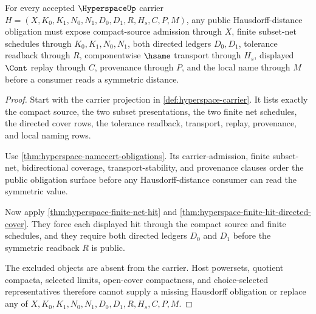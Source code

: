 \begin{theorem}
\label{thm:hyperspace-hausdorff-obligation-surface}
For every accepted $\HyperspaceUp$ carrier $H=(X,K_0,K_1,N_0,N_1,D_0,D_1,R,H_s,C,P,M)$, any public Hausdorff-distance obligation must expose compact-source admission through $X$, finite subset-net schedules through $K_0,K_1,N_0,N_1$, both directed ledgers $D_0,D_1$, tolerance readback through $R$, componentwise $\hsame$ transport through $H_s$, displayed $\Cont$ replay through $C$, provenance through $P$, and the local name through $M$ before a consumer reads a symmetric distance.
\end{theorem}
\begin{proof}
Start with the carrier projection in \autoref{def:hyperspace-carrier}. It lists exactly the compact source, the two subset presentations, the two finite net schedules, the directed cover rows, the tolerance readback, transport, replay, provenance, and local naming rows.

Use \autoref{thm:hyperspace-namecert-obligations}. Its carrier-admission, finite subset-net, bidirectional coverage, transport-stability, and provenance clauses order the public obligation surface before any Hausdorff-distance consumer can read the symmetric value.

Now apply \autoref{thm:hyperspace-finite-net-hit} and \autoref{thm:hyperspace-finite-hit-directed-cover}. They force each displayed hit through the compact source and finite schedules, and they require both directed ledgers $D_0$ and $D_1$ before the symmetric readback $R$ is public.

The excluded objects are absent from the carrier. Host powersets, quotient compacta, selected limits, open-cover compactness, and choice-selected representatives therefore cannot supply a missing Hausdorff obligation or replace any of $X,K_0,K_1,N_0,N_1,D_0,D_1,R,H_s,C,P,M$.
\end{proof}

